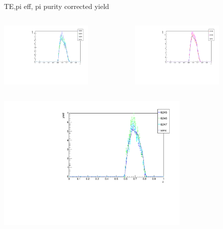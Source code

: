 \begin{frame}{TE,pi eff, pi purity corrected yield}
\begin{columns}
\begin{column}[T]{0.5\textwidth}
\includegraphics[width = 0.7\textwidth]{results/yield/check/yieldcheck_160_neg.pdf}
\end{column}
\begin{column}[T]{0.5\textwidth}
\includegraphics[width = 0.7\textwidth]{results/yield/check/yieldcheck_160_pos.pdf}
\end{column}
\end{columns}
\begin{columns}
\begin{column}[T]{0.5\textwidth}
\includegraphics[width = 0.7\textwidth]{results/yield/check/yieldcheck_150_neg.pdf}

\end{column}
\end{columns}
\end{frame}
